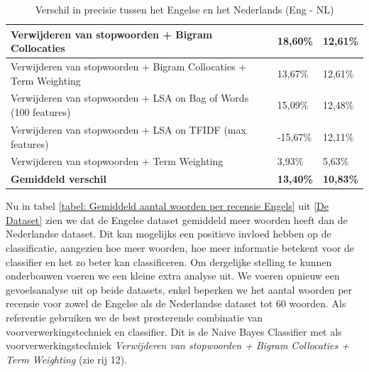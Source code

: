 \begin{table}[h]
\begin{adjustbox}{width=1\textwidth}
\begin{tabular}{|l|l|l|}
Verwijderen van stopwoorden + Bigram Collocaties                                     & 18,60\%                                           & 12,61\%                                  \\ \hline
Verwijderen van stopwoorden + Bigram Collocaties + Term Weighting                    & 13,67\%                                           & 12,61\%                                  \\ \hline
Verwijderen van stopwoorden + LSA on Bag of Words (100 features)                     & 15,09\%                                           & 12,48\%                                  \\ \hline
Verwijderen van stopwoorden + LSA on TFIDF (max features)                            & -15,67\%                                          & 12,11\%                                  \\ \hline
Verwijderen van stopwoorden + Term Weighting                                         & 3,93\%                                            & 5,63\%                                   \\ \hline
{\bf Gemiddeld verschil}                                                             & {\bf 13,40\%}                                     & {\bf 10,83\%}                            \\ \hline
\end{tabular}
\end{adjustbox}
\caption{Verschil in precisie tussen het Engelse en het Nederlands (Eng - NL)}
\label{tabel: verschil engels en nederlandse prestatie}
\end{table}

Nu in tabel \ref{tabel: Gemiddeld aantal woorden per recensie Engels} uit \ref{De Dataset} zien we dat de Engelse dataset gemiddeld meer woorden heeft dan de Nederlandse dataset. Dit kan mogelijks een positieve invloed hebben op de classificatie, aangezien hoe meer woorden, hoe meer informatie betekent voor de classifier en het zo beter kan classificeren. Om dergelijke stelling te kunnen onderbouwen voeren we een kleine extra analyse uit. We voeren opnieuw een gevoelsanalyse uit op beide datasets, enkel beperken we het aantal woorden per recensie voor zowel de Engelse als de Nederlandse dataset tot 60 woorden. Als referentie gebruiken we de best presterende combinatie van voorverwerkingstechniek en classifier. Dit is de Naive Bayes Classifier met als voorverwerkingstechniek \textit{Verwijderen van stopwoorden + Bigram Collocaties + Term Weighting} (zie rij 12).


